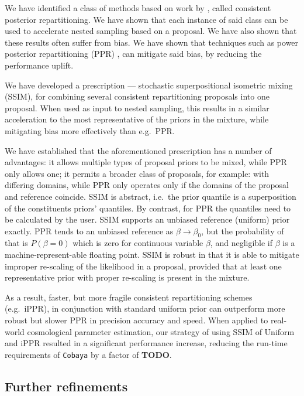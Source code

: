 \documentclass[usenatbib]{mnras}
\newcommand{\TODO}{\textbf{TODO}}
\begin{document}
We have identified a class of methods based on work by
\cite{chen-ferroz-hobson}, called consistent posterior
repartitioning. We have shown that each instance of said class can be
used to accelerate nested sampling based on a proposal. We have also
shown that these results often suffer from bias. We have shown that
techniques such as power posterior repartitioning (PPR)
\cite{chen-ferroz-hobson}, can mitigate said bias, by reducing the
performance uplift.

We have developed a prescription --- stochastic superpositional
isometric mixing (SSIM), for combining several consistent repartitioning
proposals into one proposal. When used as input to nested sampling,
this results in a similar acceleration to the most representative of
the priors in the mixture, while mitigating bias more effectively than
e.g.~PPR.

We have established that the aforementioned prescription has a number
of advantages: it allows multiple types of proposal priors to be
mixed, while PPR only allows one; it permits a broader class of
proposals, for example: with differing domains, while PPR only
operates only if the domains of the proposal and reference coincide.
SSIM is abstract, i.e.~the prior quantile is a superposition of the
constituents priors' quantiles. By contrast, for PPR the quantiles
need to be calculated by the user. SSIM supports an unbiased reference
(uniform) prior exactly. PPR tends to an unbiased reference as
\(\beta\rightarrow\beta_{0}\), but the probability of that is
\(P(\beta=0)\) which is zero for continuous variable $\beta$, and
negligible if $\beta$ is a machine-represent-able floating point. SSIM
is robust in that it is able to mitigate improper re-scaling of the
likelihood in a proposal, provided that at least one representative
prior with proper re-scaling is present in the mixture.

As a result, faster, but more fragile consistent repartitioning
schemes (e.g.~iPPR), in conjunction with standard uniform prior can
outperform more robust but slower PPR in precision accuracy and speed.
When applied to real-world cosmological parameter estimation, our
strategy of using SSIM of Uniform and iPPR resulted in a significant
performance increase, reducing the run-time requirements of
\texttt{Cobaya} by a factor of \TODO.

\subsection{Further refinements}\label{sec:org8314ddf}
\end{document}
